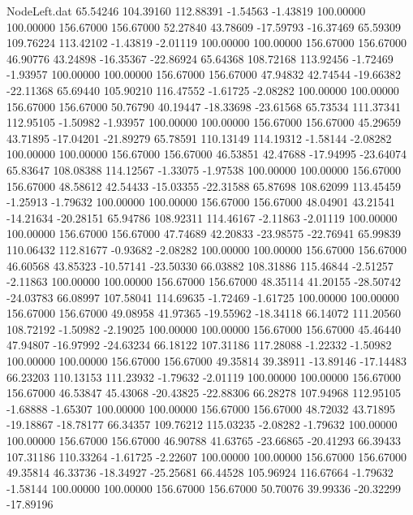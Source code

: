 \begin{filecontents}{NodeLeft.dat}
  65.54246  104.39160  112.88391    -1.54563   -1.43819  100.00000  100.00000  156.67000  156.67000   52.27840   43.78609  -17.59793  -16.37469
  65.59309  109.76224  113.42102    -1.43819   -2.01119  100.00000  100.00000  156.67000  156.67000   46.90776   43.24898  -16.35367  -22.86924
  65.64368  108.72168  113.92456    -1.72469   -1.93957  100.00000  100.00000  156.67000  156.67000   47.94832   42.74544  -19.66382  -22.11368
  65.69440  105.90210  116.47552    -1.61725   -2.08282  100.00000  100.00000  156.67000  156.67000   50.76790   40.19447  -18.33698  -23.61568
  65.73534  111.37341  112.95105    -1.50982   -1.93957  100.00000  100.00000  156.67000  156.67000   45.29659   43.71895  -17.04201  -21.89279
  65.78591  110.13149  114.19312    -1.58144   -2.08282  100.00000  100.00000  156.67000  156.67000   46.53851   42.47688  -17.94995  -23.64074
  65.83647  108.08388  114.12567    -1.33075   -1.97538  100.00000  100.00000  156.67000  156.67000   48.58612   42.54433  -15.03355  -22.31588
  65.87698  108.62099  113.45459    -1.25913   -1.79632  100.00000  100.00000  156.67000  156.67000   48.04901   43.21541  -14.21634  -20.28151
  65.94786  108.92311  114.46167    -2.11863   -2.01119  100.00000  100.00000  156.67000  156.67000   47.74689   42.20833  -23.98575  -22.76941
  65.99839  110.06432  112.81677    -0.93682   -2.08282  100.00000  100.00000  156.67000  156.67000   46.60568   43.85323  -10.57141  -23.50330
  66.03882  108.31886  115.46844    -2.51257   -2.11863  100.00000  100.00000  156.67000  156.67000   48.35114   41.20155  -28.50742  -24.03783
  66.08997  107.58041  114.69635    -1.72469   -1.61725  100.00000  100.00000  156.67000  156.67000   49.08958   41.97365  -19.55962  -18.34118
  66.14072  111.20560  108.72192    -1.50982   -2.19025  100.00000  100.00000  156.67000  156.67000   45.46440   47.94807  -16.97992  -24.63234
  66.18122  107.31186  117.28088    -1.22332   -1.50982  100.00000  100.00000  156.67000  156.67000   49.35814   39.38911  -13.89146  -17.14483
  66.23203  110.13153  111.23932    -1.79632   -2.01119  100.00000  100.00000  156.67000  156.67000   46.53847   45.43068  -20.43825  -22.88306
  66.28278  107.94968  112.95105    -1.68888   -1.65307  100.00000  100.00000  156.67000  156.67000   48.72032   43.71895  -19.18867  -18.78177
  66.34357  109.76212  115.03235    -2.08282   -1.79632  100.00000  100.00000  156.67000  156.67000   46.90788   41.63765  -23.66865  -20.41293
  66.39433  107.31186  110.33264    -1.61725   -2.22607  100.00000  100.00000  156.67000  156.67000   49.35814   46.33736  -18.34927  -25.25681
  66.44528  105.96924  116.67664    -1.79632   -1.58144  100.00000  100.00000  156.67000  156.67000   50.70076   39.99336  -20.32299  -17.89196

\end{filecontents}
